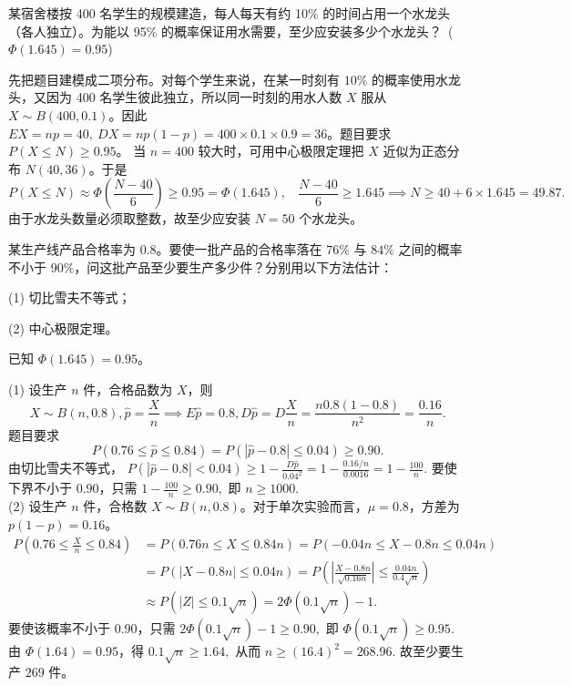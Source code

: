 \documentclass[lang=cn,11pt]{elegantbook}
\begin{document}
\begin{exercise}\label{exer:5-clt-tap}
某宿舍楼按 400 名学生的规模建造，每人每天有约 10\% 的时间占用一个水龙头（各人独立）。为能以 95\% 的概率保证用水需要，至少应安装多少个水龙头？\ (\(\Phi(1.645) = 0.95\))
\end{exercise}
\begin{solution}
先把题目建模成二项分布。对每个学生来说，在某一时刻有 \(10\%\) 的概率使用水龙头，又因为 400 名学生彼此独立，所以同一时刻的用水人数 \(X\) 服从 \(X\sim B(400,0.1)\)。因此 \(EX=np=40,\ DX=np(1-p)=400\times 0.1\times 0.9=36\)。题目要求 \(P(X\le N)\ge 0.95\)。
当 \(n=400\) 较大时，可用中心极限定理把 \(X\) 近似为正态分布 \(N(40,36)\)。于是
\[
P(X \leq N) \approx \Phi\!\left(\frac{N - 40}{6}\right) \geq 0.95 = \Phi(1.645),~~~~
\frac{N-40}{6}\ge 1.645 \implies N\ge 40+6\times 1.645=49.87.
\]
由于水龙头数量必须取整数，故至少应安装 \(N=50\) 个水龙头。
\end{solution}


\begin{exercise}\label{exer:src-probstat-test1-06}
某生产线产品合格率为 \(0.8\)。要使一批产品的合格率落在 \(76\%\) 与 \(84\%\) 之间的概率不小于 \(90\%\)，问这批产品至少要生产多少件？分别用以下方法估计：\par
(1) 切比雪夫不等式；\par
(2) 中心极限定理。\par
已知 \(\Phi(1.645)=0.95\)。
\end{exercise}
\begin{solution}
(1) 设生产 \(n\) 件，合格品数为 \(X\)，则
\[
X\sim B(n,0.8),\hat p=\frac Xn\implies
E\hat p=0.8,D\hat p=D\frac{X}{n}=\frac{n0.8(1-0.8)}{n^2}=\frac{0.16}{n}.
\]
题目要求
\[
P(0.76\le \hat p\le0.84)
=P(|\hat p-0.8|\le0.04)\ge0.90.
\]由切比雪夫不等式，
\(
P(|\hat p-0.8|<0.04)
\ge1-\frac{D\hat p}{0.04^2}
=1-\frac{0.16/n}{0.0016}
=1-\frac{100}{n}.
\)
要使下界不小于 \(0.90\)，只需
\(
1-\frac{100}{n}\ge0.90,
\)
即
\(
n\ge1000.
\)\\
(2) 设生产 \(n\) 件，合格数 \(X \sim B(n, 0.8)\)。对于单次实验而言，$\mu=0.8$，方差为 \(p(1-p) = 0.16\)。
\begin{align*}
P\!\left(0.76 \leq \frac{X}{n} \leq 0.84\right) &=P\!\left(0.76 n\leq X \leq 0.84n\right)=P\!\left(-0.04n\leq X-0.8n \leq 0.04n\right)\\
&=P\!\left(|X-0.8n|\leq 0.04n\right)=P\!\left(\left|\frac{X-0.8n}{\sqrt{0.16n}}\right|\leq
\frac{0.04n}{0.4\sqrt n}\right)\\
&\approx P(|Z|\leq0.1\sqrt n)
=2\Phi(0.1\sqrt n)-1.
\end{align*}
要使该概率不小于 \(0.90\)，只需
\(
2\Phi(0.1\sqrt n)-1\ge0.90,
\)
即
\(
\Phi(0.1\sqrt n)\ge0.95.
\)
由 \(\Phi(1.64)=0.95\)，得
\(
0.1\sqrt n\ge1.64,
\)
从而
\(
n\ge(16.4)^2=268.96.
\)
故至少要生产 \(269\) 件。
\end{solution}
\end{document}
